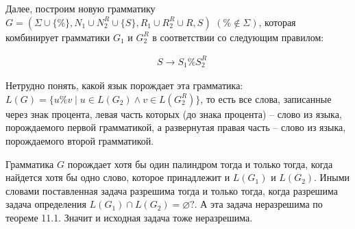 \documentclass[russian,table]{article}
\begin{document}
Далее, построим новую грамматику $G = (\Sigma \cup \{\%\}, N_1 \cup N_2^R \cup \{S\}, R_1 \cup R_2^R \cup R, S)$ $(\% \notin \Sigma)$, которая комбинирует грамматики $G_1$ и $G_2^R$ в соответствии со следующим правилом:

\begin{align*}
& S \to S_1 \% S_2^R
\end{align*}

Нетрудно понять, какой язык порождает эта грамматика: $L(G) = \{u\%v \mid u \in L(G_2) \land v \in L(G_2^R)\}$, то есть все слова, записанные через знак процента, левая часть которых (до знака процента) -- слово из языка, порождаемого первой грамматикой, а развернутая правая часть -- слово из языка, порождаемого второй грамматикой.

Грамматика $G$ порождает хотя бы один палиндром тогда и только тогда, когда найдется хотя бы одно слово, которое принадлежит и $L(G_1)$ и $L(G_2)$. Иными словами поставленная задача разрешима тогда и только тогда, когда разрешима задача определения $L(G_1) \cap L(G_2) = \varnothing ?$. А эта задача неразрешима по теореме 11.1. Значит и исходная задача тоже неразрешима.
\end{document}
